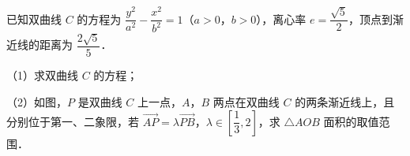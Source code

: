 \begin{question}
已知双曲线 $C$ 的方程为 $\dfrac{y^2}{a^2}-\dfrac{x^2}{b^2}=1$（$a>0$，$b>0$），离心率 $e=\dfrac{\sqrt5}2$，顶点到渐近线的距离为 $\dfrac{2\sqrt5}5$．

（1）求双曲线 $C$ 的方程；

（2）如图，$P$ 是双曲线 $C$ 上一点，$A$，$B$ 两点在双曲线 $C$ 的两条渐近线上，且分别位于第一、二象限，若 $\overrightarrow{AP}=\lambda\overrightarrow{PB}$，$\lambda\in\left[\dfrac13,2\right]$，求 $\triangle AOB$ 面积的取值范围．
\nopagebreak[4]
\begin{center}\end{center}
\nopagebreak[4]

\end{question}
\endgroup